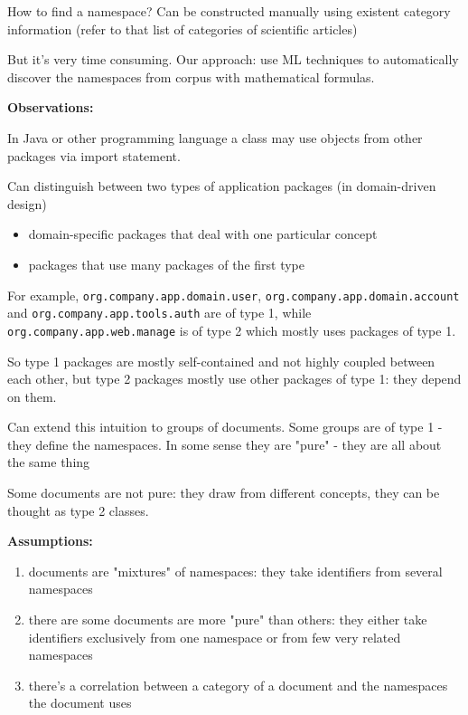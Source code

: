 How to find a namespace? Can be constructed manually using existent category information
(refer to that list of categories of scientific articles)

But it's very time consuming. Our approach: use ML techniques to automatically discover
the namespaces from corpus with mathematical formulas.


\textbf{Observations:}


In Java or other programming language a class may use objects from other packages
via import statement.

Can distinguish between two types of application packages (in domain-driven design) 

\begin{itemize}
  \item domain-specific packages that deal with one particular concept
  \item packages that use many packages of the first type
\end{itemize}

For example, \verb|org.company.app.domain.user|, \verb|org.company.app.domain.account| 
and \verb|org.company.app.tools.auth| are of type 1, while 
\verb|org.company.app.web.manage| is of type 2 which mostly uses packages of type 1. 

So type 1 packages are mostly self-contained and not highly coupled between each other,
but type 2 packages mostly use other packages of type 1: they depend on them.

Can extend this intuition to groups of documents. 
Some groups are of type 1 - they define the namespaces. 
In some sense they are "pure" - they are all about the same thing

Some documents are not pure: they draw from different concepts,
they can be thought as type 2 classes. 



\textbf{Assumptions:}


\begin{enumerate}
 \item documents are "mixtures" of namespaces: they take identifiers from several namespaces
 \item there are some documents are more "pure" than others: they either take identifiers exclusively from one namespace or from few very related namespaces
 \item there's a correlation between a category of a document and the namespaces
the document uses
\end{enumerate}


